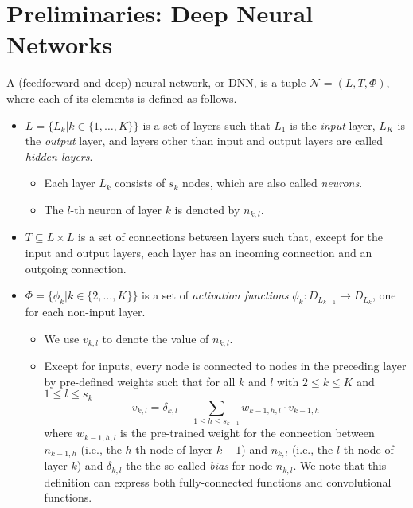 \documentclass[runningheads,a4paper]{llncs}
\newcommand{\networks}{\mathcal{N}}
\begin{document}
\section{Preliminaries: Deep Neural Networks}\newcommand{\real}{\mathds{R}}

A (feedforward and deep) neural network, or DNN, is a tuple $\networks=(L,
T, \Phi)$, where each of its elements is defined as follows.

\begin{itemize}
  \item $L=\{L_k|k\in\{1,\dots,K\}\}$ is a set of layers such that
    $L_1$ is the \emph{input} layer, $L_{K}$ is the \emph{output} layer,
    and layers other than input and output layers are called \emph{hidden layers}.
    
    \begin{itemize}
      \item Each layer $L_k$ consists of $s_k$ nodes, which are
        also called \emph{neurons}.
      \item The $l$-th neuron of layer $k$ is
        denoted by $n_{k,l}$. 
    \end{itemize}


  \item $T\subseteq L\times L$ is a set of connections between layers such that, 
    except for the input and output layers, each layer has an incoming connection and an
    outgoing connection.
  \item $\Phi=\{\phi_k|k\in\{2,\dots,K\}\}$ is a set of \emph{activation functions}
    $\phi_k:D_{L_{k-1}}\rightarrow D_{L_k}$, one for each non-input layer. 

    \begin{itemize}
      \item We use $v_{k,l}$ to denote the value of $n_{k,l}$.
      \item Except for inputs, every node is connected to nodes in the preceding
        layer by pre-defined weights such that for all $k$ and $l$ with
        $2 \leq k\leq K$ and  $1\leq l\leq s_k$
        \begin{equation}
          \label{eq:sum}
          v_{k,l}=\delta_{k,l}+\sum_{1\leq h \leq s_{k-1}} w_{k-1, h, l}\cdot v_{k-1,h}
        \end{equation}
        where $w_{k-1,h,l}$ is the pre-trained weight for the connection between
        $n_{k-1,h}$ (i.e., the $h$-th node of layer $k-1$) and $n_{k,l}$
        (i.e., the $l$-th node of layer $k$) and $\delta_{k,l}$ the the
        so-called \emph{bias} for node $n_{k,l}$.  We note that this
        definition can express both fully-connected functions and
        convolutional functions.


\end{itemize}
\end{itemize}
\end{document}
